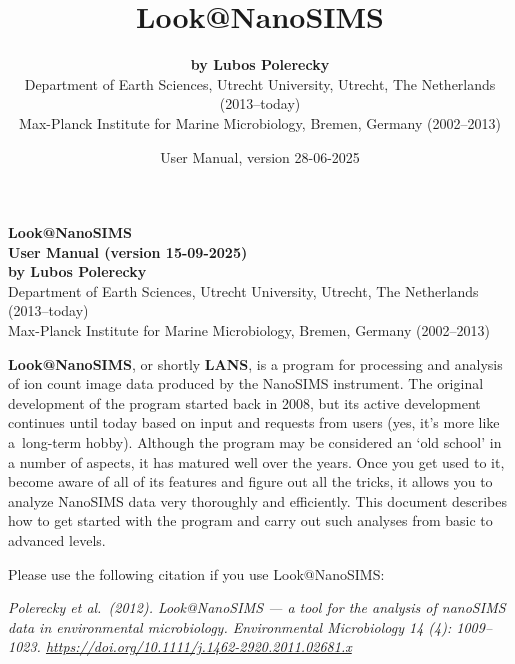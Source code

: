\documentclass[a4paper, 11pt]{article}
\title{\LARGE \bf Look@NanoSIMS}
\author{{\large\bf by Lubos Polerecky}\\[6mm]
{\small Department of Earth Sciences, Utrecht University, Utrecht, The Netherlands (2013--today)} \\%
{\small Max-Planck Institute for Marine Microbiology, Bremen, Germany (2002--2013)}\\[3mm]}
\date{User Manual, version 28-06-2025}
\begin{document}
\thispagestyle{empty}
\begin{center}
{\huge\bf Look@NanoSIMS}\\[4mm]
{\Large\bf User Manual (version 15-09-2025)}\\[12mm] 
{\Large\bf by Lubos Polerecky}\\[2mm]
{Department of Earth Sciences, Utrecht University, Utrecht, The Netherlands (2013--today)} \\%
{Max-Planck Institute for Marine Microbiology, Bremen, Germany (2002--2013)}\\[12mm]
\end{center}



\textbf{Look@NanoSIMS}, or shortly \textbf{LANS}, is a program for processing and analysis of ion count image data produced by the NanoSIMS instrument. The original development of the program started back in 2008, but its active development continues until today based on input and requests from users (yes, it's more like a~long-term hobby). Although the program may be considered an `old school' in a number of aspects, it has matured well over the years. Once you get used to it, become aware of all of its features and figure out all the tricks, it allows you to analyze NanoSIMS data very thoroughly and efficiently. This document describes how to get started with the program and carry out such analyses from basic to advanced levels. 
\tcbe

\vskip3mm
Please use the following citation if you use Look@NanoSIMS:
\begin{center}
\begin{minipage}{0.93\textwidth}
\textsl{\small Polerecky et al.~(2012). Look@NanoSIMS --- a tool for the analysis of nanoSIMS data in environmental microbiology. \textit{Environmental Microbiology} 14 (4): 1009--1023. \url{ https://doi.org/10.1111/j.1462-2920.2011.02681.x}}
\end{minipage}
\end{center}
\tcbe
\end{document}
